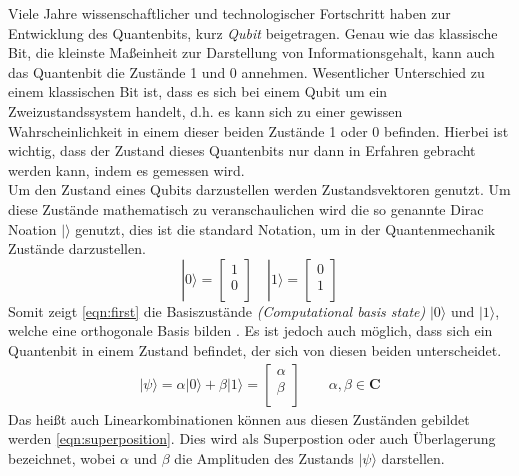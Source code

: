 Viele Jahre wissenschaftlicher und technologischer Fortschritt haben zur Entwicklung des Quantenbits, kurz \textit{Qubit} beigetragen. Genau wie das klassische Bit, die kleinste Ma\ss einheit zur Darstellung von Informationsgehalt, kann auch das Quantenbit die Zust\"ande 1 und 0 annehmen. Wesentlicher Unterschied zu einem klassischen Bit ist, dass es sich bei einem Qubit um ein Zweizustandssystem handelt, d.h. es kann sich zu einer gewissen Wahrscheinlichkeit in einem dieser beiden Zust\"ande 1 oder 0 befinden. Hierbei ist wichtig, dass der Zustand dieses Quantenbits nur dann in Erfahren gebracht werden kann, indem es gemessen wird.\\
Um den Zustand eines Qubits darzustellen werden Zustandsvektoren genutzt. Um diese Zust\"ande mathematisch zu veranschaulichen wird die so genannte Dirac Noation $|\rangle$ genutzt, dies ist die standard Notation, um in der Quantenmechanik Zust\"ande darzustellen.
\begin{equation} \label{eqn:first}
        |0\rangle = \begin{bmatrix}
        1 \\
        0 \\
        \end{bmatrix}
        \,\,\, \,\,\,
        |1\rangle = \begin{bmatrix}
        0 \\
        1 \\
        \end{bmatrix}
\end{equation}
Somit zeigt \ref{eqn:first} die Basiszust\"ande \textit{(Computational basis state)} $|0\rangle$ und $|1\rangle$, welche eine orthogonale Basis bilden \cite{nielsen_chuang_2010}. Es ist jedoch auch m\"oglich, dass sich ein Quantenbit in einem Zustand befindet, der sich von diesen beiden unterscheidet.
\begin{equation}\label{eqn:superposition}
\begin{gathered}
        |\psi\rangle = \alpha |0\rangle+\beta |1\rangle = \begin{bmatrix}
        \alpha \\
        \beta \\
        \end{bmatrix} \qquad \alpha, \beta \in \mathbf{C}
        \end{gathered}
\end{equation}
Das hei\ss t auch Linearkombinationen k\"onnen aus diesen Zust\"anden gebildet werden \ref{eqn:superposition}. Dies wird als Superpostion oder auch \"Uberlagerung bezeichnet, wobei $\alpha$ und $\beta$ die Amplituden des Zustands $|\psi\rangle$ darstellen. \\
